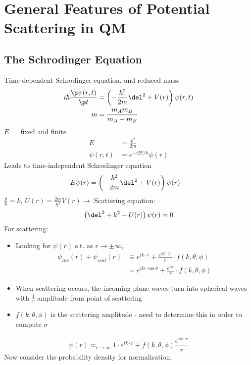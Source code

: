 \documentclass[a4paper, 11pt, normalem]{report}
\begin{document}
\chapter{General Features of Potential Scattering in QM}
\section{The Schrodinger Equation}
Time-dependent Schrodinger equation, and reduced mass:
\begin{align}
    i\hbar\frac{\p\psi(r,t)}{\p t} &= \left(-\frac{\hbar^2}{2m}\del^2 + V(r)\right)\psi(r,t) \\
    m &= \frac{m_Am_B}{m_A+m_B}
\end{align}
$E=$ fixed and finite
\begin{align}
    E&=\frac{p^2}{2m} \\
    \psi(r,t) &= e^{-iEt/\hbar}\psi(r)
\end{align}
Leads to time-independent Schrodinger equation
\begin{align}
    E\psi(r) &= \left(-\frac{\hbar^2}{2m}\del^2 + V(r)\right)\psi(r) 
\end{align}
$\frac{p}{\hbar} = k$, $U(r) = \frac{2m}{\hbar^2}V(r)\to$ Scattering equation:
\begin{equation}
    \left(\del^2 + k^2 - U(r)\right)\psi(r) = 0
\end{equation}
For scattering:
\begin{itemize}
    \item Looking for $\psi(r)$ s.t. as $r \to \pm \infty$, 
        \begin{align}
            \psi_{inc}(r) + \psi_{scat}(r) &\equiv e^{ik\cdot r} + \frac{e^{i|k|\cdot|r|}}{r}\cdot f(k,\theta,\phi) \\
                                           &= e^{ikr\cos\theta} + \frac{e^{ikr}}{r}\cdot f(k,\theta,\phi)
        \end{align}
    \item When scattering occurs, the incoming plane waves turn into spherical waves with $\frac{1}{r}$ amplitude from point of scattering
    \item $f(k,\theta,\phi)$ is the scattering amplitude - need to determine this in order to compute $\sigma$
\end{itemize}
\begin{equation}
    \psi(r) \approx_{r \to \infty} 1\cdot e^{ik\cdot r} + f(k,\theta,\phi)\frac{e^{ik\cdot r}}{r}
\end{equation}
Now consider the probability density for normalisation,
\end{document}
